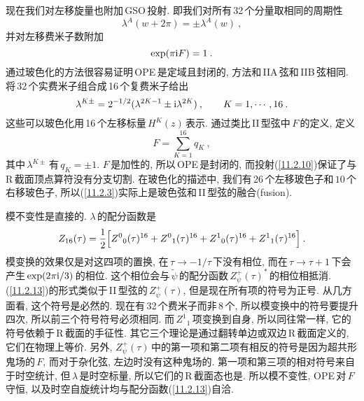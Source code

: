 现在我们对左移旋量也附加\,GSO\,投射. 即我们对所有\,32\,个分量取相同的周期性
\begin{equation}
    \lambda^{A}(w+2\pi)=\pm\lambda^{A}(w)  \:, \label{11.2.9}
\end{equation}
并对左移费米子数附加
\begin{equation}
    \exp(\pi\mathrm{i} F)=1\:. \label{11.2.10}
\end{equation}
通过玻色化的方法很容易证明\,OPE\,是定域且封闭的, 方法和\,IIA\,弦和\,IIB\,弦相同. 将\,32\,个实费米子组合成\,16\,个复费米子给出
\begin{equation}
    \lambda^{K\pm}=2^{-1/2}(\lambda^{2K-1}\pm\mathrm{i}\lambda^{2K})\:, \qquad K=1,\cdots,16 \:. \label{11.2.11}
\end{equation}
这些可以玻色化用\,16\,个左移标量$\,H^{K}(z)\,$表示. 通过类比\,II\,型弦中\,$F$\,的定义, 定义
\begin{equation}
    F=\sum_{K=1}^{16}q_{K} \:, \label{11.2.12}
\end{equation}
其中$\,\lambda^{K\pm}\,$有$\,q_{K}=\pm1$. $F\,$是加性的, 所以\,OPE\,是封闭的, 而投射(\ref{11.2.10})保证了与\,R\,截面顶点算符没有分支切割. 在玻色化的描述中, 我们有\,26\,个左移玻色子和$\,10\,$个右移玻色子, 所以(\ref{11.2.3})实际上是玻色弦和\,II\,型弦的融合(fusion). 

模不变性是直接的. $\lambda\,$的配分函数是
\begin{equation}
    Z_{16}(\tau)= \frac{1}{2}\Bigl[
    Z^{0}{}_{0}(\tau)^{16}+ Z^{0}{}_{1}(\tau)^{16}+Z^{1}{}_{0}(\tau)^{16}+Z^{1}{}_{1}(\tau)^{16}
    \Bigr] \:. \label{11.2.13}
\end{equation}
模变换的效果仅是对这四项的置换, 在\,$\tau\to -1/\tau\,$下没有相位, 而在$\,\tau\to\tau+1\,$下会产生$\,\exp(2\pi\mathrm{i}/3)\,$的相位. 这个相位会与$\,\tilde{\psi}\,$的配分函数$\,Z_{\psi}^{+}(\tau)^{\ast}\,$的相位相抵消. (\ref{11.2.13})的形式类似于\,II\,型弦的$\,Z_{\psi}^{+}(\tau)$, 但是现在所有项的符号为正号. 从几方面看, 这个符号是必然的. 现在有\,32\,个费米子而非\,8\,个, 所以模变换中的符号要提升四次, 所以前三个符号符号必须相同. 而$\,Z^{1}{}_{1}\,$项变换到自身, 所以同往常一样, 它的符号依赖于\,R\,截面的手征性. 其它三个理论是通过翻转单边或双边\,R\,截面定义的, 它们在物理上等价. 另外, $Z_{\psi}^{+}(\tau)\,$中的第一项和第二项有相反的符号是因为超共形鬼场的$\,F$, 而对于杂化弦, 左边时没有这种鬼场的. 第一项和第三项的相对符号来自于时空统计, 但\,$\lambda\,$是时空标量, 所以它们的\,R\,截面态也是. 所以模不变性, OPE\,对\,$F$\,守恒, 以及时空自旋统计均与配分函数(\ref{11.2.13})自洽.

